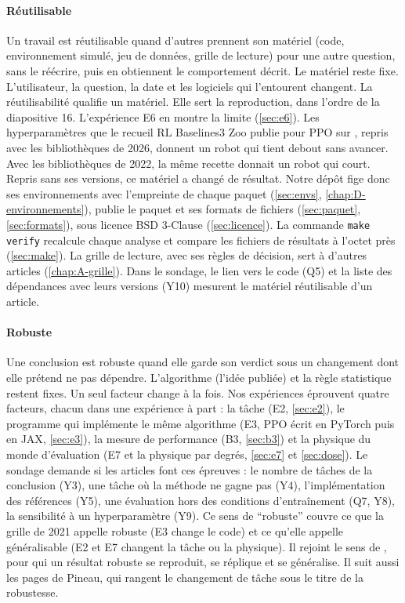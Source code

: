 \paragraph{Réutilisable}
Un travail est réutilisable quand d'autres prennent son matériel (code, environnement simulé, jeu de
données, grille de lecture) pour une autre question, sans le réécrire, puis en obtiennent le comportement
décrit. Le matériel reste fixe. L'utilisateur, la question, la date et les logiciels qui l'entourent
changent. La réutilisabilité
qualifie un matériel. Elle sert la reproduction, dans l'ordre de la diapositive 16. L'expérience E6 en montre la limite (\cref{sec:e6}). Les hyperparamètres que le recueil RL
Baselines3 Zoo publie pour PPO sur , repris avec les bibliothèques de 2026, donnent un robot
qui tient debout sans avancer. Avec les bibliothèques de 2022, la même recette donnait un robot qui court.
Repris sans ses versions, ce matériel a changé de résultat. Notre dépôt fige donc ses environnements avec
l'empreinte de chaque paquet (\cref{sec:envs}, \cref{chap:D-environnements}), publie le paquet et ses
formats de fichiers (\cref{sec:paquet}, \cref{sec:formats}), sous licence BSD 3-Clause
(\cref{sec:licence}). La commande \texttt{make verify} recalcule chaque analyse et compare les fichiers
de résultats à l'octet près (\cref{sec:make}). La grille de lecture, avec ses règles de décision, sert
à d'autres articles (\cref{chap:A-grille}). Dans le sondage, le lien vers le code (Q5) et la liste des
dépendances avec leurs versions (Y10) mesurent le matériel réutilisable d'un article.

\paragraph{Robuste}
Une conclusion est robuste quand elle garde son verdict sous un changement dont elle prétend ne pas
dépendre. L'algorithme (l'idée publiée) et la règle statistique restent fixes. Un seul facteur
change à la fois. Nos expériences éprouvent quatre facteurs, chacun dans une expérience à part : la tâche (E2, \cref{sec:e2}), le programme qui
implémente le même algorithme (E3, PPO écrit en PyTorch puis en JAX, \cref{sec:e3}), la mesure de
performance (B3, \cref{sec:b3}) et la physique du monde d'évaluation (E7 et la physique par degrés,
\cref{sec:e7} et \cref{sec:dose}). Le sondage demande si les articles font ces épreuves : le nombre de
tâches de la conclusion (Y3), une tâche où la méthode ne gagne pas (Y4), l'implémentation des références
(Y5), une évaluation hors des conditions d'entraînement (Q7, Y8), la sensibilité à un hyperparamètre
(Y9). Ce sens de \enquote{robuste} couvre ce que la grille de 2021 appelle robuste (E3 change le code)
et ce qu'elle appelle généralisable (E2 et E7 changent la tâche ou la physique). Il rejoint le sens de
\textcite{bollen2015robust}, pour qui un résultat robuste se reproduit, se réplique et se généralise. Il suit
aussi les pages de Pineau, qui rangent le changement de tâche sous le titre de la robustesse.

